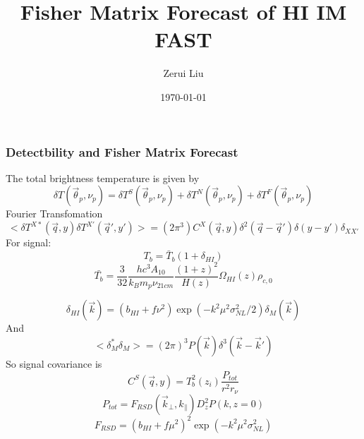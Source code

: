 \documentclass[UTF8]{beamer}
\author{Zerui Liu}
\institute{NAOC}
\title{Fisher Matrix Forecast of HI IM FAST}
\date{\today}
\begin{document}
\begin{frame}
    \maketitle
    
\end{frame}
\begin{frame}
    \frametitle{Detectbility and Fisher Matrix Forecast}

    The total brightness temperature is given by
    \begin{equation}
        \delta T(\vec{\theta}_p,\nu_p) = \delta T^S(\vec{\theta}_p,\nu_p)+\delta T^N(\vec{\theta}_p,\nu_p)+\delta T^F(\vec{\theta}_p,\nu_p)
    \end{equation}
    Fourier Transfomation
    \begin{equation}
        <\delta T^{X*}(\vec{q},y)\delta T^{X'}(\vec{q}',y')> = (2\pi^3)C^X(\vec{q},y)\delta^2(\vec{q}-\vec{q}')\delta(y-y')\delta_{XX'}
    \end{equation}
    For signal:
    \begin{equation} 
        T_b = \bar{T}_b(1+\delta_{HI})
    \end{equation}
    \begin{equation}
        \bar{T_b} = \frac{3}{32}\frac{hc^3A_{10}}{k_Bm_p\nu_{21cm}}\frac{(1+z)^2}{H(z)}\Omega_{HI}(z)\rho_{c,0}
    \end{equation}       
\end{frame}
\begin{frame}     
    
    \begin{equation}
        \delta_{HI}(\vec{k})=(b_{HI}+f\nu^2)\exp(-k^2\mu^2\sigma_{NL}^2/2)\delta_M(\vec{k})
    \end{equation}
    And
    \begin{equation}
       <\delta_M^* \delta_M>=(2\pi)^3 P(\vec{k})\delta^3(\vec{k}-\vec{k}')
    \end{equation}     
    So signal covariance is 
    \begin{equation}
        C^S(\vec{q},y)=T_b^2(z_i)\frac{P_{tot}}{r^2r_\nu}
    \end{equation}
    \begin{equation}
        P_{tot}=F_{RSD}(\vec{k}_{\perp},k_{\parallel})D_{z}^2P(k,z=0)
    \end{equation}
    \begin{equation}
        F_{RSD}=(b_{HI}+f\mu^2)^2\exp (-k^2\mu^2\sigma_{NL}^2)
    \end{equation}
\end{frame}
\end{document}
